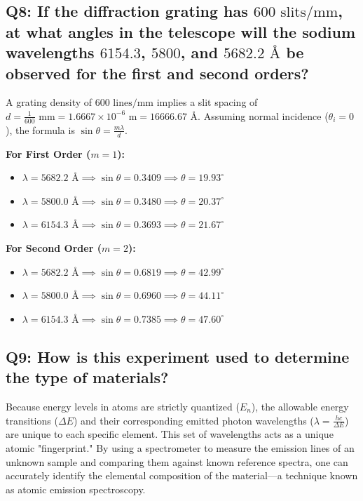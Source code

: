 \documentclass[a4paper,11pt]{article}
\begin{document}
\subsection*{Q8: If the diffraction grating has $600\text{ slits/mm}$, at what angles in the telescope will the sodium wavelengths $6154.3$, $5800$, and $5682.2\text{ \AA}$ be observed for the first and second orders?}
A grating density of $600\text{ lines/mm}$ implies a slit spacing of $d = \frac{1}{600}\text{ mm} = 1.6667 \times 10^{-6}\text{ m} = 16666.67\text{ \AA}$. Assuming normal incidence ($\theta_i = 0$), the formula is $\sin\theta = \frac{m\lambda}{d}$.

\textbf{For First Order ($m=1$):}
\begin{itemize}
    \item $\lambda = 5682.2\text{ \AA} \implies \sin\theta = 0.3409 \implies \theta = 19.93^\circ$
    \item $\lambda = 5800.0\text{ \AA} \implies \sin\theta = 0.3480 \implies \theta = 20.37^\circ$
    \item $\lambda = 6154.3\text{ \AA} \implies \sin\theta = 0.3693 \implies \theta = 21.67^\circ$
\end{itemize}

\textbf{For Second Order ($m=2$):}
\begin{itemize}
    \item $\lambda = 5682.2\text{ \AA} \implies \sin\theta = 0.6819 \implies \theta = 42.99^\circ$
    \item $\lambda = 5800.0\text{ \AA} \implies \sin\theta = 0.6960 \implies \theta = 44.11^\circ$
    \item $\lambda = 6154.3\text{ \AA} \implies \sin\theta = 0.7385 \implies \theta = 47.60^\circ$
\end{itemize}

\subsection*{Q9: How is this experiment used to determine the type of materials?}
Because energy levels in atoms are strictly quantized ($E_n$), the allowable energy transitions ($\Delta E$) and their corresponding emitted photon wavelengths ($\lambda = \frac{hc}{\Delta E}$) are unique to each specific element. This set of wavelengths acts as a unique atomic "fingerprint." By using a spectrometer to measure the emission lines of an unknown sample and comparing them against known reference spectra, one can accurately identify the elemental composition of the material—a technique known as atomic emission spectroscopy.
\end{document}
